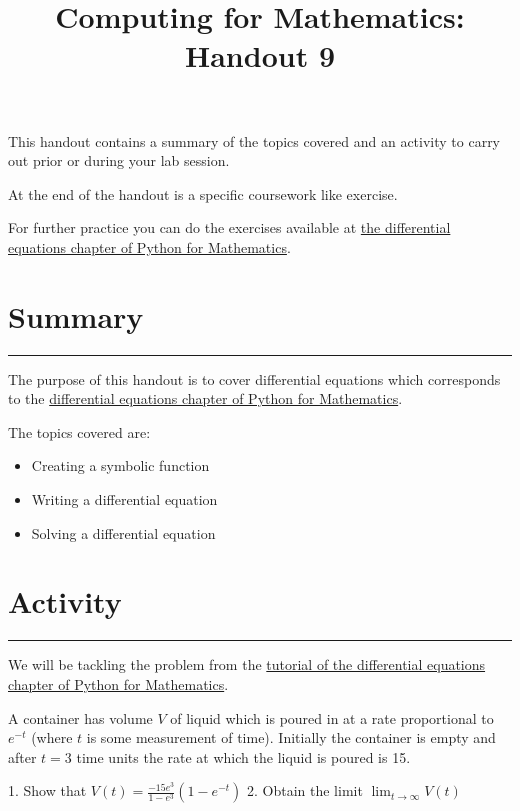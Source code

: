 \documentclass{article}
\title{Computing for Mathematics: Handout 9}
\date{}
\begin{document}
\maketitle


This handout contains a summary of the topics covered and an activity to
carry out prior or during your lab session.

At the end of the handout is a specific coursework like exercise.

For further practice you can do the exercises available at 
\href{https://vknight.org/pfm/tools-for-mathematics/09-differential-equations/introduction/main.html}{the
differential equations chapter of Python for Mathematics}.

\section{Summary}\label{summary}
\hrule


The purpose of this handout is to cover differential equations which
corresponds to the
\href{https://vknight.org/pfm/tools-for-mathematics/09-differential-equations/introduction/main.html}{differential equations
chapter of Python for Mathematics}.

The topics covered are:

\begin{itemize}
    \item Creating a symbolic function
    \item Writing a differential equation
    \item Solving a differential equation
\end{itemize}
\section{Activity}\label{activity}
\hrule

We will be tackling the problem from the
\href{https://vknight.org/pfm/tools-for-mathematics/09-differential-equations/tutorial/main.html}{tutorial
of the differential equations chapter of Python for Mathematics}.

A container has volume $V$ of liquid which is poured in at a rate proportional
to $e^{-t}$ (where $t$ is some measurement of time). Initially the container is empty and
after $t=3$ time units the rate at which the liquid is poured is 15.

1. Show that $V(t)=\frac{-15e^{3}}{1-e^{3}}(1 - e^{-t})$
2. Obtain the limit $\lim_{t\to \infty}V(t)$
\end{document}
